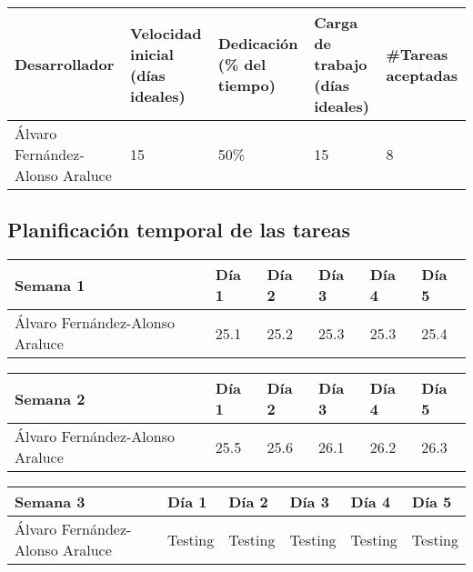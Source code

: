 \begin{table}[h]
	\centering
	\begin{tabular}{| p{3cm} | p{2cm} | p{2cm} | p{2cm} | p{2cm} |}
		\rowcolor[HTML]{329A9D} 
		{\color[HTML]{FFFFFF} \textbf{Desarrollador}} & {\color[HTML]{FFFFFF} \textbf{Velocidad inicial (días ideales)}} & {\color[HTML]{FFFFFF} \textbf{Dedicación (\% del tiempo)}} & {\color[HTML]{FFFFFF} \textbf{Carga de trabajo (días ideales)}} & {\color[HTML]{FFFFFF} \textbf{\#Tareas aceptadas}}  \\ \hline
		Álvaro Fernández-Alonso Araluce & 15 & 50\% & 15 & 8 \\ \hline
	\end{tabular}
\end{table}


\subsection{Planificación temporal de las tareas}

\begin{table}[h]
	\centering
	\begin{tabular}{| p{2cm} | p{2cm} | p{2cm} | p{2cm} | p{2cm} | p{2cm} |}
		\rowcolor[HTML]{329A9D} 
		 {\color[HTML]{FFFFFF} \textbf{Semana 1}} & {\color[HTML]{FFFFFF} \textbf{Día 1}} & {\color[HTML]{FFFFFF} \textbf{Día 2}} & {\color[HTML]{FFFFFF} \textbf{Día 3}} & {\color[HTML]{FFFFFF} \textbf{Día 4}}  & {\color[HTML]{FFFFFF} \textbf{Día 5}} \\ \hline
		Álvaro Fernández-Alonso Araluce & 25.1 & 25.2 & 25.3 & 25.3 & 25.4 \\ \hline
	\end{tabular}
\end{table}

\begin{table}[h]
	\centering
	\begin{tabular}{| p{2cm} | p{2cm} | p{2cm} | p{2cm} | p{2cm} | p{2cm} |}
		\rowcolor[HTML]{329A9D} 
		{\color[HTML]{FFFFFF} \textbf{Semana 2}} & {\color[HTML]{FFFFFF} \textbf{Día 1}} & {\color[HTML]{FFFFFF} \textbf{Día 2}} & {\color[HTML]{FFFFFF} \textbf{Día 3}} & {\color[HTML]{FFFFFF} \textbf{Día 4}}  & {\color[HTML]{FFFFFF} \textbf{Día 5}} \\ \hline
		Álvaro Fernández-Alonso Araluce & 25.5 & 25.6 & 26.1 & 26.2 & 26.3 \\ \hline
	\end{tabular}
\end{table}

\begin{table}[h]
	\centering
	\begin{tabular}{| p{2cm} | p{2cm} | p{2cm} | p{2cm} | p{2cm} | p{2cm} |}
		\rowcolor[HTML]{329A9D} 
		{\color[HTML]{FFFFFF} \textbf{Semana 3}} & {\color[HTML]{FFFFFF} \textbf{Día 1}} & {\color[HTML]{FFFFFF} \textbf{Día 2}} & {\color[HTML]{FFFFFF} \textbf{Día 3}} & {\color[HTML]{FFFFFF} \textbf{Día 4}}  & {\color[HTML]{FFFFFF} \textbf{Día 5}} \\ \hline
		Álvaro Fernández-Alonso Araluce & Testing & Testing & Testing &Testing & Testing \\ \hline
	\end{tabular}
\end{table}

